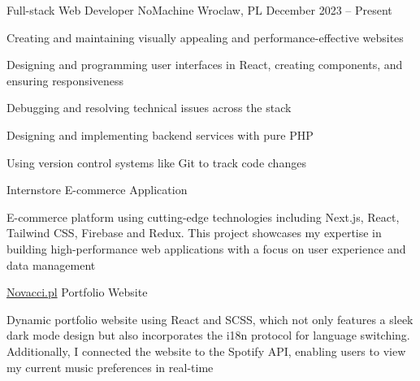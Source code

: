 \documentclass[]{awesome-cv}
\begin{document}
\vspace{-5mm}
\begin{cventries}
  \cventry
  {Full-stack Web Developer}
  {NoMachine}
  {Wroclaw, PL}
  {December 2023 – Present}
  {\begin{cvitems}
    \item {Creating and maintaining visually appealing and performance-effective websites}
    \item {Designing and programming user interfaces in React, creating components, and ensuring responsiveness}
    \item {Debugging and resolving technical issues across the stack}
    \item {Designing and implementing backend services with pure PHP}
    \item {Using version control systems like Git to track code changes}
	\vspace{1.5mm} 
    \end{cvitems}}
	\vspace{2mm} 
	\cventry
  {Internstore}
  {E-commerce Application}
  {}
  {}
  {\begin{cvitems}
    \item {E-commerce platform using cutting-edge technologies including Next.js, React, Tailwind CSS, Firebase and Redux. This project showcases my expertise in building high-performance web applications with a focus on user experience and data management}
    \end{cvitems}}
	\cventry
{\href{https://novacci.pl/}{Novacci.pl}}
  {Portfolio Website}
  {}
  {}
  {\begin{cvitems}
    \item {Dynamic portfolio website using React and SCSS, which not only features a sleek dark mode design but also incorporates the i18n protocol for language switching. Additionally, I connected the website to the Spotify API, enabling users to view my current music preferences in real-time}
    \end{cvitems}}
\end{cventries}
\vspace{-2mm}
\end{document}
